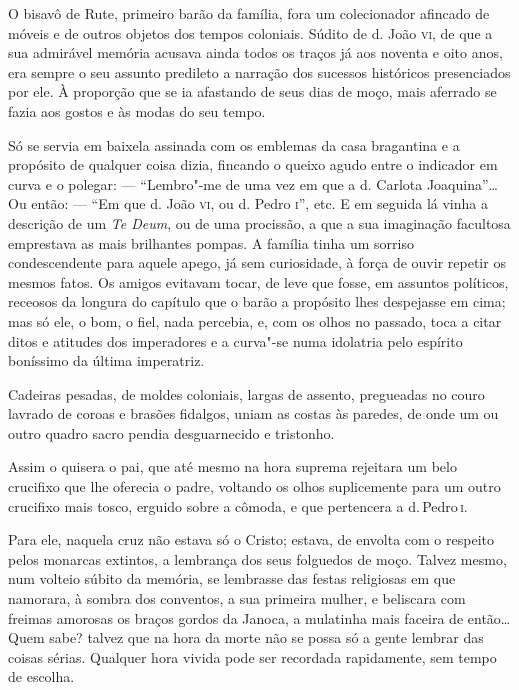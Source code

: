 \asterisc

O bisavô de Rute, primeiro barão da família, fora um colecionador
afincado de móveis e de outros objetos dos tempos coloniais. Súdito de
d. João \textsc{vi}, de que a sua admirável memória acusava ainda todos os traços
já aos noventa e oito anos, era sempre o seu assunto predileto a
narração dos sucessos históricos presenciados por ele. À proporção que
se ia afastando de seus dias de moço, mais aferrado se fazia aos gostos
e às modas do seu tempo.

Só se servia em baixela assinada com os emblemas da casa bragantina e a
propósito de qualquer coisa dizia, fincando o queixo agudo entre o
indicador em curva e o polegar: --- ``Lembro"-me de uma vez em que a d.
Carlota Joaquina''\ldots{} Ou então: --- ``Em que d. João \textsc{vi}, ou d. Pedro \textsc{i}'',
etc. E em seguida lá vinha a descrição de um \emph{Te Deum}, ou de uma
procissão, a que a sua imaginação facultosa emprestava as mais
brilhantes pompas. A família tinha um sorriso condescendente para aquele
apego, já sem curiosidade, à força de ouvir repetir os mesmos fatos. Os
amigos evitavam tocar, de leve que fosse, em assuntos políticos,
receosos da longura do capítulo que o barão a propósito lhes despejasse
em cima; mas só ele, o bom, o fiel, nada percebia, e, com os olhos no
passado, toca a citar ditos e atitudes dos imperadores e a curva"-se
numa idolatria pelo espírito boníssimo da última imperatriz.

Cadeiras pesadas, de moldes coloniais, largas de assento, pregueadas no
couro lavrado de coroas e brasões fidalgos, uniam as costas às paredes,
de onde um ou outro quadro sacro pendia desguarnecido e tristonho.

Assim o quisera o pai, que até mesmo na hora suprema rejeitara um belo
crucifixo que lhe oferecia o padre, voltando os olhos suplicemente para
um outro crucifixo mais tosco, erguido sobre a cômoda, e que pertencera
a d.\,Pedro\,\textsc{i}.

Para ele, naquela cruz não estava só o Cristo; estava, de envolta com o
respeito pelos monarcas extintos, a lembrança dos seus folguedos de
moço. Talvez mesmo, num volteio súbito da memória, se lembrasse das
festas religiosas em que namorara, à sombra dos conventos, a sua
primeira mulher, e beliscara com freimas amorosas os braços gordos da
Janoca, a mulatinha mais faceira de então\ldots{} Quem sabe? talvez que na
hora da morte não se possa só a gente lembrar das coisas sérias.
Qualquer hora vivida pode ser recordada rapidamente, sem tempo de
escolha.

